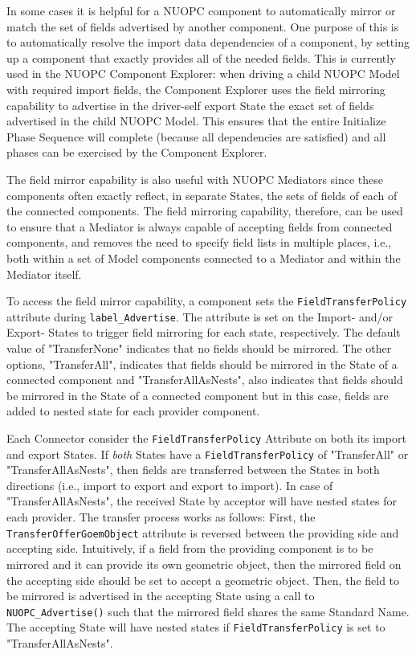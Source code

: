%

\label{FieldMirror}

In some cases it is helpful for a NUOPC component to automatically mirror or match the set of fields advertised by another component.  One purpose of this is to automatically resolve the import data dependencies of a component, by setting up a component that exactly provides all of the needed fields.  This is currently used in the NUOPC Component Explorer:  when driving a child NUOPC Model with required import fields, the Component Explorer uses the field mirroring capability to advertise in the driver-self export State the exact set of fields advertised in the child NUOPC Model.  This ensures that the entire Initialize Phase Sequence will complete (because all dependencies are satisfied) and all phases can be exercised by the Component Explorer.

The field mirror capability is also useful with NUOPC Mediators since these components often exactly reflect, in separate States, the sets of fields of each of the connected components.  The field mirroring capability, therefore, can be used to ensure that a Mediator is always capable of accepting fields from connected components, and removes the need to specify field lists in multiple places, i.e., both within a set of Model components connected to a Mediator and within the Mediator itself.

To access the field mirror capability, a component sets the {\tt FieldTransferPolicy} attribute during {\tt label\_Advertise}. The attribute is set on the Import- and/or Export- States to trigger field mirroring for each state, respectively.  The default value of "TransferNone" indicates that no fields should be mirrored.  The other options, "TransferAll", indicates that fields should be mirrored in the State of a connected component and "TransferAllAsNests", also indicates that fields should be mirrored in the State of a connected component but in this case, fields are added to nested state for each provider component.

Each Connector consider the {\tt FieldTransferPolicy} Attribute on both its import and export States.  If {\em both} States have a {\tt FieldTransferPolicy} of "TransferAll" or "TransferAllAsNests", then fields are transferred between the States in both directions (i.e., import to export and export to import).  In case of "TransferAllAsNests", the received State by acceptor will have nested states for each provider. The transfer process works as follows:  First, the {\tt TransferOfferGoemObject} attribute is reversed between the providing side and accepting side.  Intuitively, if a field from the providing component is to be mirrored and it can provide its own geometric object, then the mirrored field on the accepting side should be set to accept a geometric object.  Then, the field to be mirrored is advertised in the accepting State using a call to {\tt NUOPC\_Advertise()} such that the mirrored field shares the same Standard Name. The accepting State will have nested states if {\tt FieldTransferPolicy} is set to "TransferAllAsNests".

